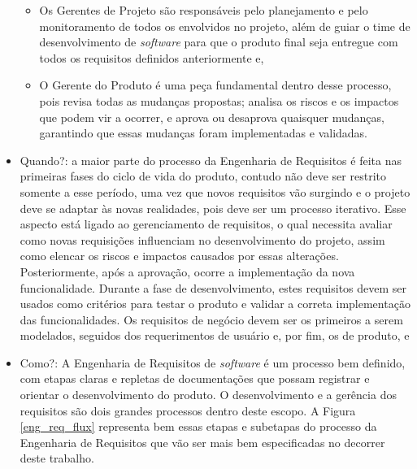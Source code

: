 \begin{itemize}
\begin{itemize}
        \item Os Gerentes de Projeto são responsáveis pelo planejamento e pelo monitoramento de todos os envolvidos no projeto, além de guiar o time de desenvolvimento de \textit{software} para que o produto final seja entregue com todos os requisitos definidos anteriormente e,
    
        \item O Gerente do Produto é uma peça fundamental dentro desse processo, pois revisa todas as mudanças propostas; analisa os riscos e os impactos que podem vir a ocorrer, e aprova ou desaprova quaisquer mudanças, garantindo que essas mudanças foram implementadas e validadas.
    \end{itemize}
    
    \item Quando?: a maior parte do processo da Engenharia de Requisitos é feita nas primeiras fases do ciclo de vida do produto, contudo não deve ser restrito somente a esse período, uma vez que novos requisitos vão surgindo e o projeto deve se adaptar às novas realidades, pois deve ser um processo iterativo. Esse aspecto está ligado ao gerenciamento de requisitos, o qual necessita avaliar como novas requisições influenciam no desenvolvimento do projeto, assim como elencar os riscos e impactos causados por essas alterações. Posteriormente, após a aprovação, ocorre a implementação da nova funcionalidade. Durante a fase de desenvolvimento, estes requisitos devem ser usados como critérios para testar o produto e validar a correta implementação das funcionalidades. Os requisitos de negócio devem ser os primeiros a serem modelados, seguidos dos requerimentos de usuário e, por fim, os de produto, e
    
    \item Como?: A Engenharia de Requisitos de \textit{software} é um processo bem definido, com etapas claras e repletas de documentações que possam registrar e orientar o desenvolvimento do produto. O desenvolvimento e a gerência dos requisitos são dois grandes processos dentro deste escopo. A Figura \ref{eng_req_flux} representa bem essas etapas e subetapas do processo da Engenharia de Requisitos que vão ser mais bem especificadas no decorrer deste trabalho.
    

\end{itemize}
